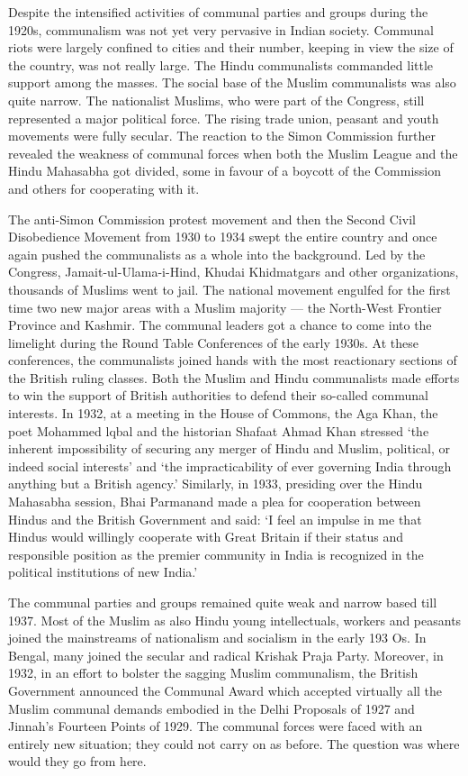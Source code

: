 Despite the intensified activities of communal parties and groups during the 1920s, communalism was not yet very pervasive in Indian society. Communal riots were largely confined to cities and their number, keeping in view the size of the country, was not really large. The Hindu communalists commanded little support among the masses. The social base of the Muslim communalists was also quite narrow. The nationalist Muslims, who were part of the Congress, still represented a major political force. The rising trade union, peasant and youth movements were fully secular. The reaction to the Simon Commission further revealed the weakness of communal forces when both the Muslim League and the Hindu Mahasabha got divided, some in favour of a boycott of the Commission and others for cooperating with it. 

The anti-Simon Commission protest movement and then the Second Civil Disobedience Movement from 1930 to 1934 swept the entire country and once again pushed the communalists as a whole into the background. Led by the Congress, Jamait-ul-Ulama-i-Hind, Khudai Khidmatgars and other organizations, thousands of Muslims went to jail. The national movement engulfed for the first time two new major areas with a Muslim majority --- the North-West Frontier Province and Kashmir. The communal leaders got a chance to come into the limelight during the Round Table Conferences of the early 1930s. At these conferences, the communalists joined hands with the most reactionary sections of the British ruling classes. Both the Muslim and Hindu communalists made efforts to win the support of British authorities to defend their so-called communal interests. In 1932, at a meeting in the House of Commons, the Aga Khan, the poet Mohammed lqbal and the historian Shafaat Ahmad Khan stressed `the inherent impossibility of securing any merger of Hindu and Muslim, political, or indeed social interests' and `the impracticability of ever governing India through anything but a British agency.' Similarly, in 1933, presiding over the Hindu Mahasabha session, Bhai Parmanand made a plea for cooperation between Hindus and the British Government and said: `I feel an impulse in me that Hindus would willingly cooperate with Great Britain if their status and responsible position as the premier community in India is recognized in the political institutions of new India.' 

The communal parties and groups remained quite weak and narrow based till 1937. Most of the Muslim as also Hindu young intellectuals, workers and peasants joined the mainstreams of nationalism and socialism in the early 193 Os. In Bengal, many joined the secular and radical Krishak Praja Party. Moreover, in 1932, in an effort to bolster the sagging Muslim communalism, the British Government announced the Communal Award which accepted virtually all the Muslim communal demands embodied in the Delhi Proposals of 1927 and Jinnah's Fourteen Points of 1929. The communal forces were faced with an entirely new situation; they could not carry on as before. The question was where would they go from here. 